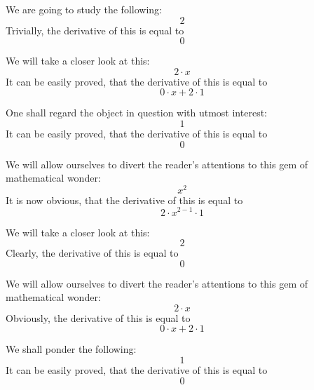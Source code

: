 \documentclass{article}
\begin{document}
We are going to study the following:
\begin{equation}
2 
\end{equation}
Trivially, the derivative of this is equal to
\begin{equation}
0 
\end{equation}

We will take a closer look at this:
\begin{equation}
2 \cdot x 
\end{equation}
It can be easily proved, that the derivative of this is equal to
\begin{equation}
0 \cdot x + 2 \cdot 1 
\end{equation}

One shall regard the object in question with utmost interest:
\begin{equation}
1 
\end{equation}
It can be easily proved, that the derivative of this is equal to
\begin{equation}
0 
\end{equation}

We will allow ourselves to divert the reader's attentions to this gem of mathematical wonder:
\begin{equation}
x ^{2 } 
\end{equation}
It is now obvious, that the derivative of this is equal to
\begin{equation}
2 \cdot x ^{2 - 1 } \cdot 1 
\end{equation}

We will take a closer look at this:
\begin{equation}
2 
\end{equation}
Clearly, the derivative of this is equal to
\begin{equation}
0 
\end{equation}

We will allow ourselves to divert the reader's attentions to this gem of mathematical wonder:
\begin{equation}
2 \cdot x 
\end{equation}
Obviously, the derivative of this is equal to
\begin{equation}
0 \cdot x + 2 \cdot 1 
\end{equation}

We shall ponder the following:
\begin{equation}
1 
\end{equation}
It can be easily proved, that the derivative of this is equal to
\begin{equation}
0 
\end{equation}
\end{document}
